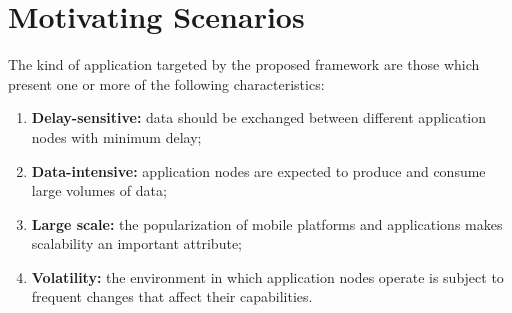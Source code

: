 \section{Motivating Scenarios}

The kind of application targeted by the proposed framework are those which present one or more of the following characteristics:

\begin{enumerate}[label=\arabic*.]
	
	\item \textbf{Delay-sensitive:} data should be exchanged between different application nodes with minimum delay;
	
	\item \textbf{Data-intensive:} application nodes are expected to produce and consume large volumes of data;
	
	\item \textbf{Large scale:} the popularization of mobile platforms and applications makes scalability an important attribute;
	
	\item \textbf{Volatility:} the environment in which application nodes operate is subject to frequent changes that affect their capabilities.

\end{enumerate}

	


%
%
%

